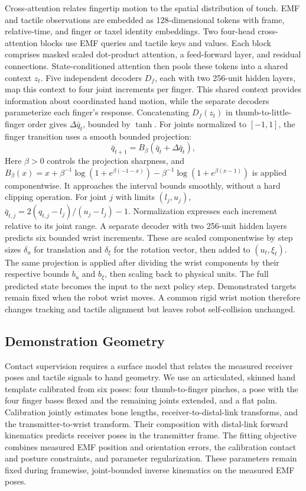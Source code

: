 Cross-attention relates fingertip motion to the spatial distribution of touch. EMF and tactile observations are embedded as 128-dimensional tokens with frame, relative-time, and finger or taxel identity embeddings. Two four-head cross-attention blocks use EMF queries and tactile keys and values. Each block comprises masked scaled dot-product attention, a feed-forward layer, and residual connections. State-conditioned attention then pools these tokens into a shared context $z_t$. Five independent decoders $D_f$, each with two 256-unit hidden layers, map this context to four joint increments per finger. This shared context provides information about coordinated hand motion, while the separate decoders parameterize each finger's response. Concatenating $D_f(z_t)$ in thumb-to-little-finger order gives $\Delta\bar q_t$, bounded by $\tanh$. For joints normalized to $[-1,1]$, the finger transition uses a smooth bounded projection:
\begin{equation}
    \bar q_{t+1} = B_\beta(\bar q_t + \Delta\bar q_t),
    \label{eq:cart-state-update}
\end{equation}
Here $\beta>0$ controls the projection sharpness, and $B_\beta(x)=x+\beta^{-1}\log(1+e^{\beta(-1-x)})-\beta^{-1}\log(1+e^{\beta(x-1)})$ is applied componentwise. It approaches the interval bounds smoothly, without a hard clipping operation. For joint $j$ with limits $(l_j,u_j)$, $\bar q_{t,j}=2(q_{t,j}-l_j)/(u_j-l_j)-1$. Normalization expresses each increment relative to its joint range. A separate decoder with two 256-unit hidden layers predicts six bounded wrist increments. These are scaled componentwise by step sizes $\delta_u$ for translation and $\delta_\xi$ for the rotation vector, then added to $(u_t,\xi_t)$. The same projection is applied after dividing the wrist components by their respective bounds $b_u$ and $b_\xi$, then scaling back to physical units. The full predicted state becomes the input to the next policy step. Demonstrated targets remain fixed when the robot wrist moves. A common rigid wrist motion therefore changes tracking and tactile alignment but leaves robot self-collision unchanged.

\subsection{Demonstration Geometry}
\label{sec:cart-hand-mesh}

Contact supervision requires a surface model that relates the measured receiver poses and tactile signals to hand geometry. We use an articulated, skinned hand template calibrated from six poses: four thumb-to-finger pinches, a pose with the four finger bases flexed and the remaining joints extended, and a flat palm. Calibration jointly estimates bone lengths, receiver-to-distal-link transforms, and the transmitter-to-wrist transform. Their composition with distal-link forward kinematics predicts receiver poses in the transmitter frame. The fitting objective combines measured EMF position and orientation errors, the calibration contact and posture constraints, and parameter regularization. These parameters remain fixed during framewise, joint-bounded inverse kinematics on the measured EMF poses.

